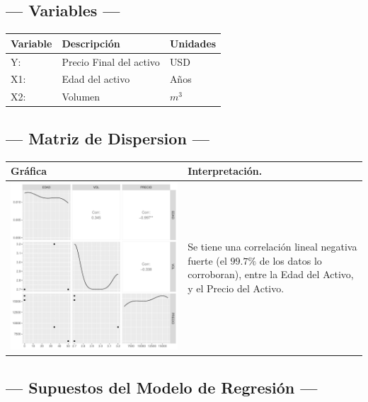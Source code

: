 \subsection{\centering --- Variables ---} %
\begin{center}
  \begin{tabular}{|l|l|l|}
    \hline 
    Variable & Descripción   & Unidades\\ \hline 
    Y:  & Precio Final del activo  & USD \\ \hline 
    X1: & Edad del activo    & Años \\ \hline 
		X2: & Volumen  & \(m ^ 3\) \\ \hline 
  \end{tabular}
\end{center} 

\subsection{\centering --- Matriz de Dispersion ---} %
\begin{center}
  \begin{tabular}{|p{11cm}|p{5cm}|}
    \hline
    Gráfica & Interpretación. \\ \hline 
    \begin{minipage}{\textwidth}
    \includegraphics[width= 0.5 \linewidth, page=1]{../0.documentos/3_MERGED_MARKET/3_BOMBO_BATIDOR/r/Rplots.pdf}
    \end{minipage} 
    &
		Se tiene una correlación lineal negativa fuerte (el \(99.7\%\) de los datos lo corroboran),
		entre la Edad del Activo, y el Precio del Activo.
		\\ \hline 
  \end{tabular}
\end{center} 

\subsection{\centering --- Supuestos del Modelo de Regresión ---} %

